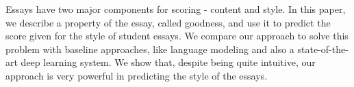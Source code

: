 Essays have two major components for scoring - content and style. In this paper, we describe a property of the essay, called goodness, and use it to predict the score given for the style of student essays. We compare our approach to solve this problem with baseline approaches, like language modeling and also a state-of-the-art deep learning system. We show that, despite being quite intuitive, our approach is very powerful in predicting the style of the essays.
